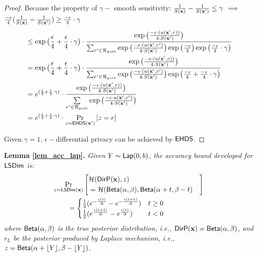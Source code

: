 \documentclass{article}
\begin{document}
\begin{proof}
  Because the property of $\gamma -$ smooth sensitivity: $\frac{1}{S(\textbf{x})} - \frac{1}{S(\textbf{x}')} \leq \gamma$ $\implies$
  $\frac{- \epsilon}{4}
  (\frac{1}{S(\textbf{x})}-
  \frac{1}{S(\textbf{x}')}) \geq \frac{- \epsilon}{4} \cdot \gamma$
  \begin{equation*}
  \begin{split}
  & \leq \exp\big( \frac{\epsilon}{4} + \frac{\epsilon}{4} \cdot \gamma\big) \cdot 
  \frac {
  \exp
  \big(
  \frac{-\epsilon\cdot(u(\textbf{x}', {r}))}{4\cdot S(\textbf{x}')}
  \big)
  } 
  {
  \sum_{r'\in \mathcal{R}_{\textup{post}}} 
  \exp 
  \big(
  \frac{-\epsilon\cdot(u(\textbf{x}', {r'})}{4 \cdot S(\textbf{x}')}
  \big)
  \exp 
  \big(
  \frac{-\epsilon}{4}
  \big)
  \exp
  \big(
  \frac{- \epsilon}{4} \cdot \gamma
  \big)
  }\\
  & = \exp\big( \frac{\epsilon}{4} + \frac{\epsilon}{4} \cdot \gamma\big) \cdot 
  \frac {
  \exp
  \big(
  \frac{-\epsilon\cdot(u(\textbf{x}', {r}))}{4\cdot S(\textbf{x}')}
  \big)
  } 
  {
  \sum_{r'\in \mathcal{R}_{\textup{post}}} 
  \exp 
  \big(
  \frac{-\epsilon\cdot(u(\textbf{x}', {r'})}{4 \cdot S(\textbf{x}')}
  \big)
  \exp 
  \big(
  \frac{-\epsilon}{4} +   \frac{- \epsilon}{4} \cdot \gamma
  \big)
  }\\
  & = e^{( \frac{\epsilon}{2} + \frac{\epsilon}{2} \cdot \gamma )} \cdot 
  \frac {
  \exp
  \big(
  \frac{-\epsilon\cdot(u(\textbf{x}', {r}))}{4\cdot S(\textbf{x}')}
  \big)
  } 
  {
  \sum\limits_{r'\in \mathcal{R}_{\textup{post}}} \exp \big(\frac{-\epsilon\cdot u(\textbf{x}', r')}{4 \cdot S(\textbf{x}')}\big)
  }\\
  & = e^{( \frac{\epsilon}{2} + \frac{\epsilon}{2} \cdot \gamma )} \cdot   \underset{z \thicksim \mathsf{EHDS}(\textbf{x}')}{\Pr}\left[ z = r \right]
  \end{split}
  \end{equation*}

  Given $\gamma = 1$, $\epsilon - $differential privacy can be achieved by $\mathsf{EHDS}$.


\end{proof}


\noindent \textbf{ Lemma \ref{lem_acc_lap}.}
\emph{
Given $Y \thicksim \mathsf{Lap}(0, b)$, the accuracy bound developed for $\mathsf{LSDim}$ is:
\begin{align*}
&
\lapmechPr{\dataobs}{
\begin{aligned}
\lefteqn{\hellinger(\bysinfer{\dataobs}, z )}\\ 
&= \hellinger(\betad(\alpha, \beta), \betad(\alpha + t, \beta - t)
\end{aligned}
}
\\
&\qquad = 
\begin{cases}
\frac{1}{2} (e^{- \frac{\epsilon (t)}{\Delta }} - e^{- \frac{\epsilon (t + 1)}{\Delta }}) &  t \geq 0\\
\frac{1}{2} (e^{\frac{\epsilon (t + 1)}{\Delta }} - e^{\frac{\epsilon (t)}{\Delta }}) & t < 0
\end{cases}
\end{align*}
where $\mathsf{Beta}(\alpha, \beta)$ is the true posterior distribution, i.e., $\mathsf{DirP}(\textbf{x}) = \mathsf{Beta}(\alpha, \beta)$, and $r_L$ be the posterior produced by Laplace mechanism, i.e., $z = \mathsf{Beta}(\alpha + \lfloor Y \rfloor, \beta - \lfloor Y \rfloor)$.
}
\end{document}
